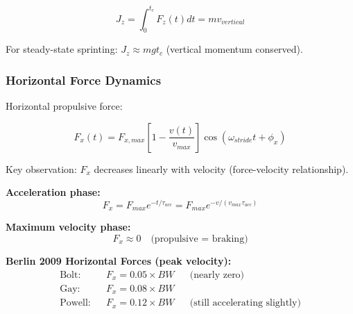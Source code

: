 \begin{equation}
J_z = \int_0^{t_c} F_z(t) dt = m v_{vertical}
\label{eq:vertical_impulse}
\end{equation}

For steady-state sprinting: $J_z \approx m g t_c$ (vertical momentum conserved).

\subsubsection{Horizontal Force Dynamics}

Horizontal propulsive force:

\begin{equation}
F_x(t) = F_{x,max} \left[1 - \frac{v(t)}{v_{max}}\right] \cos(\omega_{stride} t + \phi_x)
\label{eq:horizontal_force_dynamics}
\end{equation}

Key observation: $F_x$ decreases linearly with velocity (force-velocity relationship).

\textbf{Acceleration phase:}
\begin{equation}
F_x = F_{max} e^{-t/\tau_{acc}} = F_{max} e^{-v/(v_{max} \tau_{acc})}
\label{eq:acceleration_force}
\end{equation}

\textbf{Maximum velocity phase:}
\begin{equation}
F_x \approx 0 \quad \text{(propulsive = braking)}
\label{eq:max_velocity_force}
\end{equation}

\textbf{Berlin 2009 Horizontal Forces (peak velocity):}
\begin{align}
\text{Bolt:} && F_x = 0.05 \times BW && \text{(nearly zero)} \\
\text{Gay:} && F_x = 0.08 \times BW \\
\text{Powell:} && F_x = 0.12 \times BW && \text{(still accelerating slightly)}
\end{align}

